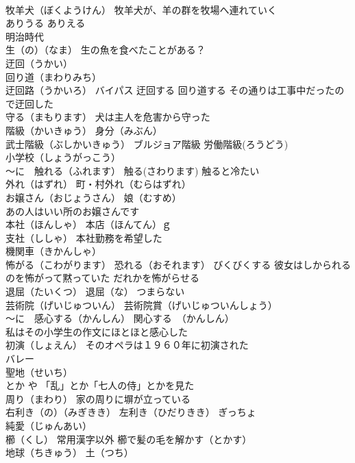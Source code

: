 \documentclass[8pt]{extreport}
\begin{document}
\begin{CJK}{UTF8}{min}
\\	牧羊犬（ぼくようけん） 牧羊犬が、羊の群を牧場へ連れていく
\\	ありうる ありえる
\\	明治時代 
\\	生（の）（なま） 生の魚を食べたことがある？
\\	迂回（うかい）
\\	回り道（まわりみち）
\\	迂回路（うかいろ） バイパス 迂回する 回り道する その通りは工事中だったので迂回した
\\	守る（まもります） 犬は主人を危害から守った
\\	階級（かいきゅう） 身分（みぶん）
\\	武士階級（ぶしかいきゅう） ブルジョア階級 労働階級(ろうどう)
\\	小学校（しょうがっこう）
\\	～に　触れる（ふれます） 触る(さわります) 触ると冷たい
\\	外れ（はずれ） 町・村外れ（むらはずれ）
\\	お嬢さん（おじょうさん） 娘（むすめ） 
\\	あの人はいい所のお嬢さんです
\\	本社（ほんしゃ） 本店（ほんてん）ｇ
\\	支社（ししゃ） 本社勤務を希望した
\\	機関車（きかんしゃ）
\\	怖がる（こわがります） 恐れる（おそれます） びくびくする 彼女はしかられるのを怖がって黙っていた だれかを怖がらせる
\\	退屈（たいくつ） 退屈（な） つまらない
\\	芸術院（げいじゅついん） 芸術院賞（げいじゅついんしょう）
\\	～に　感心する（かんしん） 関心する　（かんしん）　
\\	私はその小学生の作文にほとほと感心した
\\	初演（しょえん） そのオペラは１９６０年に初演された
\\	バレー
\\	聖地（せいち）
\\	とか や 「乱」とか「七人の侍」とかを見た
\\	周り（まわり） 家の周りに塀が立っている
\\	右利き（の）（みぎきき） 左利き（ひだりきき） ぎっちょ 
\\	純愛（じゅんあい）
\\	櫛（くし） 常用漢字以外 櫛で髪の毛を解かす（とかす）
\\	地球（ちきゅう） 土（つち） 

\end{CJK}
\end{document}
